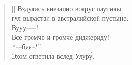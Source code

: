 \documentclass[14pt]{memoir}
\begin{document}
\BgThispage



\begin{verse}[\versewidth]
Вздулись внезапно вокруг паутины\\
гул вырастал в австралийской пустыне.\\
Вууу--{}--{}--{!}\\
Всё громче и громче диджериду!\\
\emph{``{}--{}--буу--{!}''}\\
Эхом ответила вслед Улур\'{у}.
\end{verse}
\newpage
\end{document}

